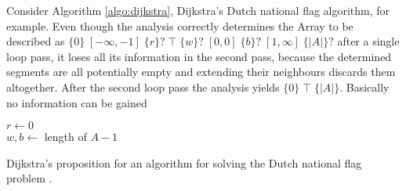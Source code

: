 \documentclass[runningheads]{llncs}
\newcommand{\bound}[1]{\{#1\}}
\newcommand{\fvalue}[1]{\;#1\;}
\begin{document}
 Consider Algorithm \ref{algo:dijkstra}, Dijkstra's Dutch national flag algorithm, for example. Even though the analysis correctly determines the Array to be described as $\bound{0} \fvalue{[-\infty, -1]} \bound{r}? \fvalue{\top} \bound{w}? \fvalue{[0, 0]} \bound{b}? \fvalue{[1, \infty]}  \bound{|A|}?$ after a single loop pass, it loses all its information in the second pass, because the determined segments are all potentially empty and extending their neighbours discards them altogether. After the second loop pass the analysis yields $\bound{0} \fvalue{\top} \bound{|A|}$. Basically no information can be gained   
 
 \begin{algorithm}
\DecMargin{5mm}
\vspace{1.5mm}
$r \leftarrow 0$\\
$w,b \leftarrow$ length of $A-1$ \\
\vspace{1.5mm}
\caption{Dijkstra's proposition for an algorithm for solving the Dutch national flag problem \cite{dijkstra1976}. }\label{algo:dijkstra}
\end{algorithm}



\newpage


\end{document}
